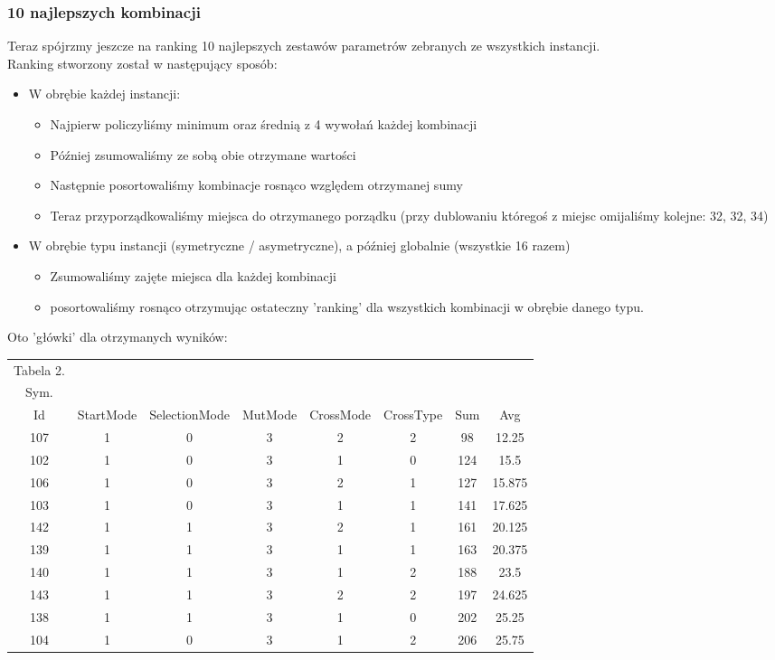 \documentclass{article}
\begin{document}
\subsubsection{10 najlepszych kombinacji}
Teraz spójrzmy jeszcze na ranking 10 najlepszych zestawów parametrów zebranych ze wszystkich instancji.\\
Ranking stworzony został w następujący sposób:
\begin{itemize}
	\item W obrębie każdej instancji:
	\begin{itemize}
		\item Najpierw policzyliśmy minimum oraz średnią z 4 wywołań każdej kombinacji
		\item Później zsumowaliśmy ze sobą obie otrzymane wartości
		\item Następnie posortowaliśmy kombinacje rosnąco względem otrzymanej sumy
		\item Teraz przyporządkowaliśmy miejsca do otrzymanego porządku (przy dublowaniu któregoś z miejsc omijaliśmy kolejne: 32, 32, 34)	
	\end{itemize}
	\item W obrębie typu instancji (symetryczne / asymetryczne),  a później globalnie (wszystkie 16 razem)
	\begin{itemize}
		\item Zsumowaliśmy zajęte miejsca dla każdej kombinacji
		\item posortowaliśmy rosnąco otrzymując ostateczny 'ranking' dla wszystkich kombinacji w obrębie danego typu.	
	\end{itemize}
\end{itemize}

Oto 'główki' dla otrzymanych wyników:
\begin{table}[h!]
	\centering
	\begin{tabular}{c||c|c|c|c|c||c|c}
Tabela 2.\\
Sym.\\
Id & StartMode & SelectionMode & MutMode & CrossMode & CrossType & Sum & Avg \\
\hline
107 & 1 & 0 & 3 & 2 & 2 & 98 & 12.25 \\
102 & 1 & 0 & 3 & 1 & 0 & 124 & 15.5 \\
106 & 1 & 0 & 3 & 2 & 1 & 127 & 15.875 \\
103 & 1 & 0 & 3 & 1 & 1 & 141 & 17.625 \\
142 & 1 & 1 & 3 & 2 & 1 & 161 & 20.125 \\
139 & 1 & 1 & 3 & 1 & 1 & 163 & 20.375 \\
140 & 1 & 1 & 3 & 1 & 2 & 188 & 23.5 \\
143 & 1 & 1 & 3 & 2 & 2 & 197 & 24.625 \\
138 & 1 & 1 & 3 & 1 & 0 & 202 & 25.25 \\
104 & 1 & 0 & 3 & 1 & 2 & 206 & 25.75 \\
	\end{tabular}
\end{table}
\end{document}
